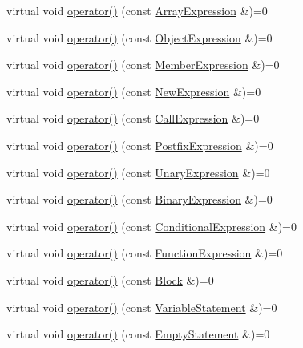 \begin{DoxyCompactItemize}
\item 
virtual void \hyperlink{struct_visitor_a99d582c067b225f1022a27c44beb801c}{operator()} (const \hyperlink{struct_array_expression}{Array\+Expression} \&)=0
\item 
virtual void \hyperlink{struct_visitor_a58d0e4e708057211465ba14290a0a154}{operator()} (const \hyperlink{struct_object_expression}{Object\+Expression} \&)=0
\item 
virtual void \hyperlink{struct_visitor_a175fd29619240cc378703de4c357f348}{operator()} (const \hyperlink{struct_member_expression}{Member\+Expression} \&)=0
\item 
virtual void \hyperlink{struct_visitor_a13ead8d5ef82f284e301ba8127e9fb56}{operator()} (const \hyperlink{struct_new_expression}{New\+Expression} \&)=0
\item 
virtual void \hyperlink{struct_visitor_aa6152c6f355690fd1c4db37fff303614}{operator()} (const \hyperlink{struct_call_expression}{Call\+Expression} \&)=0
\item 
virtual void \hyperlink{struct_visitor_acd630c29940c6785726ce51c7db0aab9}{operator()} (const \hyperlink{struct_postfix_expression}{Postfix\+Expression} \&)=0
\item 
virtual void \hyperlink{struct_visitor_ad2e06814dadca4469f4036ba9a00afd7}{operator()} (const \hyperlink{struct_unary_expression}{Unary\+Expression} \&)=0
\item 
virtual void \hyperlink{struct_visitor_a6132b5969ec220e7c98af3a957f48a0e}{operator()} (const \hyperlink{struct_binary_expression}{Binary\+Expression} \&)=0
\item 
virtual void \hyperlink{struct_visitor_a132fc5e3ff45efb2869272fbe5d5f815}{operator()} (const \hyperlink{struct_conditional_expression}{Conditional\+Expression} \&)=0
\item 
virtual void \hyperlink{struct_visitor_a3f6eb67942d7e2c83a761de2bd66a60a}{operator()} (const \hyperlink{struct_function_expression}{Function\+Expression} \&)=0
\item 
virtual void \hyperlink{struct_visitor_a3a26b45c1ab418661f992d97ed9ec9f0}{operator()} (const \hyperlink{struct_block}{Block} \&)=0
\item 
virtual void \hyperlink{struct_visitor_accbed2e228126d93b162df7bb44bb3c8}{operator()} (const \hyperlink{struct_variable_statement}{Variable\+Statement} \&)=0
\item 
virtual void \hyperlink{struct_visitor_a67719a8d9005a86141e4cb9226c11ca4}{operator()} (const \hyperlink{struct_empty_statement}{Empty\+Statement} \&)=0

\end{DoxyCompactItemize}
